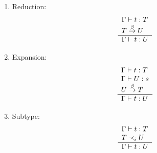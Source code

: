 \begin{definition}
\begin{enumerate}
\begin{enumerate}
        \item Reduction:
            $$
            \begin{array}{l} 
                \Gamma \vdash t: T
                \\
                T \stackrel{\beta}{\to} U
             \\ \hline 
                \Gamma \vdash t: U
            \end{array}
            $$

        \item Expansion:
            $$
            \begin{array}{l} 
                \Gamma \vdash t: T
                \\
                \Gamma \vdash U: s
                \\
                U \stackrel{\beta}{\to} T
             \\ \hline 
                \Gamma \vdash t: U
            \end{array}
            $$

        \item Subtype:
            $$
            \begin{array}{l} 
                \Gamma \vdash t: T
                \\
                T \prec_i U
             \\ \hline 
                \Gamma \vdash t: U
            \end{array}
            $$
        \end{enumerate}

    \end{enumerate}
\end{definition}
